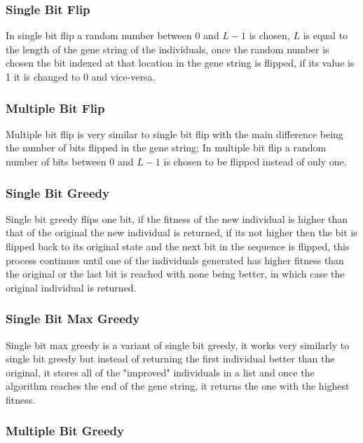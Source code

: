 	\subsubsection{Single Bit Flip}

	In single bit flip a random number between 0 and $L-1$ is chosen, $L$ is equal to the length of the gene string of the individuals, once the random number is chosen the bit indexed at that location in the gene string is flipped, if its value is 1 it is changed to 0 and vice-versa.

	\subsubsection{Multiple Bit Flip}

	Multiple bit flip is very similar to single bit flip with the main difference being the number of bits flipped in the gene string; In multiple bit flip a random number of bits between 0 and $L-1$ is chosen to be flipped instead of only one.

	\subsubsection{Single Bit Greedy}

	Single bit greedy flips one bit, if the fitness of the new individual is higher than that of the original the new individual is returned, if its not higher then the bit is flipped back to its original state and the next bit in the sequence is flipped, this process continues until one of the individuals generated has higher fitness than the original or the last bit is reached with none being better, in which case the original individual is returned.

	\subsubsection{Single Bit Max Greedy}

	Single bit max greedy is a variant of single bit greedy, it works very similarly to single bit greedy but instead of returning the first individual better than the original, it stores all of the "improved" individuals in a list and once the algorithm reaches the end of the gene string, it returns the one with the highest fitness.

	\subsubsection{Multiple Bit Greedy}

